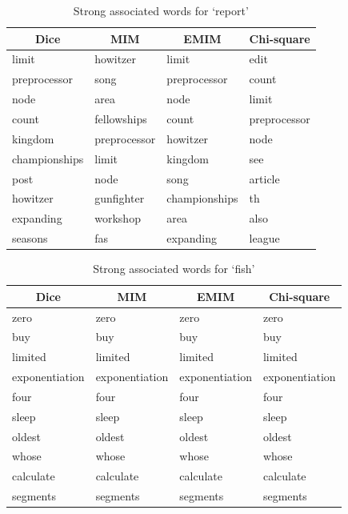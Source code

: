 \documentclass[letterpaper,11pt]{article}
\begin{document}
\begin{table}[H]
\centering
\begin{tabular}{|l|l|l|l|}
\hline
\multicolumn{1}{|c|}{\textbf{Dice}} & \multicolumn{1}{c|}{\textbf{MIM}} & \multicolumn{1}{c|}{\textbf{EMIM}} & \multicolumn{1}{c|}{\textbf{Chi-square}} \\ \hline
limit & howitzer & limit & edit \\ \hline
preprocessor & song & preprocessor & count \\ \hline
node & area & node & limit \\ \hline
count & fellowships & count & preprocessor \\ \hline
kingdom & preprocessor & howitzer & node \\ \hline
championships & limit & kingdom & see \\ \hline
post & node & song & article \\ \hline
howitzer & gunfighter & championships & th \\ \hline
expanding & workshop & area & also \\ \hline
seasons & fas & expanding & league \\ \hline
\end{tabular}
\caption{Strong associated words for `report'}
\label{my-label}
\end{table}

\begin{table}[H]
\centering
\begin{tabular}{|l|l|l|l|}
\hline
\multicolumn{1}{|c|}{\textbf{Dice}} & \multicolumn{1}{c|}{\textbf{MIM}} & \multicolumn{1}{c|}{\textbf{EMIM}} & \multicolumn{1}{c|}{\textbf{Chi-square}} \\ \hline
zero & zero & zero & zero \\ \hline
buy & buy & buy & buy \\ \hline
limited & limited & limited & limited \\ \hline
exponentiation & exponentiation & exponentiation & exponentiation \\ \hline
four & four & four & four \\ \hline
sleep & sleep & sleep & sleep \\ \hline
oldest & oldest & oldest & oldest \\ \hline
whose & whose & whose & whose \\ \hline
calculate & calculate & calculate & calculate \\ \hline
segments & segments & segments & segments \\ \hline
\end{tabular}
\caption{Strong associated words for `fish'}
\label{my-label}
\end{table}
\end{document}
